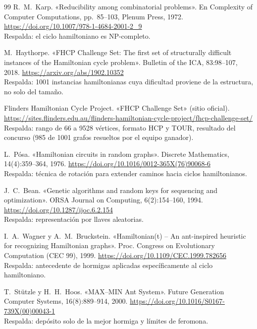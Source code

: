 \begin{thebibliography}{99}
R.~M.~Karp. «Reducibility among combinatorial problems». En Complexity of
        Computer Computations, pp.~85--103, Plenum Press, 1972.
        \url{https://doi.org/10.1007/978-1-4684-2001-2_9}\\
        Respalda: el ciclo hamiltoniano es NP-completo.

M.~Haythorpe. «FHCP Challenge Set: The first set of structurally difficult instances
        of the Hamiltonian cycle problem». Bulletin of the ICA, 83:98--107, 2018.
        \url{https://arxiv.org/abs/1902.10352}\\
        Respalda: 1001 instancias hamiltonianas cuya dificultad proviene de la
        estructura, no solo del tamaño.

Flinders Hamiltonian Cycle Project. «FHCP Challenge Set» (sitio oficial).
        \url{https://sites.flinders.edu.au/flinders-hamiltonian-cycle-project/fhcp-challenge-set/}\\
        Respalda: rango de 66 a 9528 vértices, formato HCP y TOUR, resultado del
        concurso (985 de 1001 grafos resueltos por el equipo ganador).

L.~Pósa. «Hamiltonian circuits in random graphs». Discrete Mathematics,
        14(4):359--364, 1976. \url{https://doi.org/10.1016/0012-365X(76)90068-6}\\
        Respalda: técnica de rotación para extender caminos hacia ciclos hamiltonianos.

J.~C.~Bean. «Genetic algorithms and random keys for sequencing and optimization».
        ORSA Journal on Computing, 6(2):154--160, 1994.
        \url{https://doi.org/10.1287/ijoc.6.2.154}\\
        Respalda: representación por llaves aleatorias.

I.~A.~Wagner y A.~M.~Bruckstein. «Hamiltonian(t) -- An ant-inspired heuristic for
        recognizing Hamiltonian graphs». Proc. Congress on Evolutionary Computation
        (CEC 99), 1999. \url{https://doi.org/10.1109/CEC.1999.782656}\\
        Respalda: antecedente de hormigas aplicadas específicamente al ciclo
        hamiltoniano.

T.~Stützle y H.~H.~Hoos. «MAX--MIN Ant System». Future Generation Computer
        Systems, 16(8):889--914, 2000.
        \url{https://doi.org/10.1016/S0167-739X(00)00043-1}\\
        Respalda: depósito solo de la mejor hormiga y límites de feromona.


\end{thebibliography}
